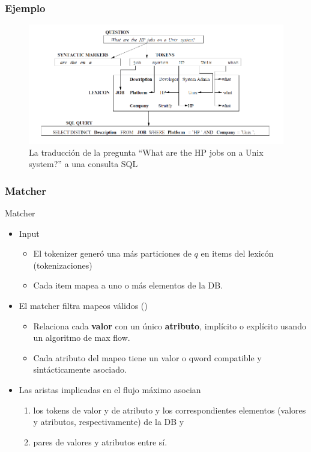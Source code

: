 \fontsize{11pt}{7.2}\selectfont
\begin{frame}
\frametitle{Ejemplo}
\begin{figure}
  \centering
    \includegraphics[scale=.7]{graficos/popescu-example}
  \caption{La traducción de la pregunta ``What are the HP jobs on a Unix system?'' a una consulta SQL}
  \label{fig:popescu-example}
\end{figure}
\end{frame}

\begin{frame}[<+->]
\frametitle{Matcher}
   
   \begin{block}{Matcher}
     \begin{itemize}
      \item Input
      \begin{itemize}
        \item El tokenizer generó una más particiones de $q$ en items del lexicón (tokenizaciones)
        \item Cada item mapea a uno o más elementos de la DB.
      \end{itemize}
      \item El matcher filtra mapeos válidos ()
        \begin{itemize}
          \item  Relaciona cada \textbf{valor} con un único \textbf{atributo}, implícito o explícito usando un algoritmo de max flow.
           \item Cada {\color{blue}atributo} del mapeo tiene un {\color{blue}valor} o {\color{green}qword} compatible y sintácticamente asociado.
        \end{itemize}
    \end{itemize} 
  \end{block}
  
  \begin{itemize}
    \item Las aristas implicadas en el flujo máximo asocian 
    \begin{enumerate}
      \item los tokens de valor y de atributo y los correspondientes elementos (valores y atributos, respectivamente) de la DB y 
      \item pares de valores y atributos entre sí.
    \end{enumerate}
    \end{itemize}
          
\end{frame}

